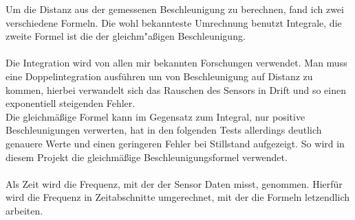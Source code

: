 Um die Distanz aus der gemessenen Beschleunigung zu berechnen,
fand ich zwei verschiedene Formeln. Die wohl bekannteste Umrechnung 
benutzt Integrale, die zweite Formel ist die der gleichm"aßigen 
Beschleunigung.\\
\\
Die Integration wird von allen mir bekannten Forschungen verwendet. 
Man muss eine Doppelintegration
ausführen um von Beschleunigung auf Distanz zu kommen, hierbei verwandelt 
sich das Rauschen des Sensors in Drift und so einen exponentiell steigenden
Fehler. \\ 
Die gleichmäßige Formel kann im Gegensatz zum Integral, nur positive 
Beschleunigungen verwerten, hat in den folgenden Tests allerdings 
deutlich genauere Werte und einen geringeren Fehler bei Stillstand 
aufgezeigt. So wird in diesem Projekt die gleichmäßige Beschleunigungsformel 
verwendet.\\
\\
Als Zeit wird die Frequenz, mit der der Sensor Daten misst, 
genommen. Hierfür wird die Frequenz in Zeitabschnitte umgerechnet, mit 
der die Formeln letzendlich arbeiten.